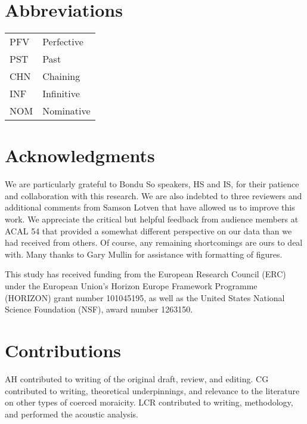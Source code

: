 \documentclass[output=paper,colorlinks,citecolor=brown]{langscibook}
\begin{document}
\section*{Abbreviations}
\begin{tabularx}{.5\textwidth}{@{}lQ@{}}
\textsc{PFV} & Perfective \\
\textsc{PST} & Past \\
\textsc{CHN} & Chaining \\
\textsc{INF} & Infinitive \\
\textsc{NOM} & Nominative \\
\end{tabularx}

\section*{Acknowledgments}
We are particularly grateful to Bondu So speakers, HS and IS, for their patience and collaboration with this research. We are also indebted to three reviewers and additional comments from Samson Lotven that have allowed us to improve this work. We appreciate the critical but helpful feedback from audience members at ACAL 54 that provided a somewhat different perspective on our data than we had received from others. Of course, any remaining shortcomings are ours to deal with. Many thanks to Gary Mullin for assistance with formatting of figures.

This study has received funding from the European Research Council (ERC) under the European Union’s Horizon Europe Framework Programme (HORIZON) grant number 101045195, as well as the United States National Science Foundation (NSF), award number 1263150.

\section*{Contributions}
AH contributed to writing of the original draft, review, and editing.
CG contributed to writing, theoretical underpinnings, and relevance to the literature on other types of coerced moraicity.
LCR contributed to writing, methodology, and performed the acoustic analysis. 


{\sloppy\printbibliography[heading=subbibliography,notkeyword=this]}
\end{document}
